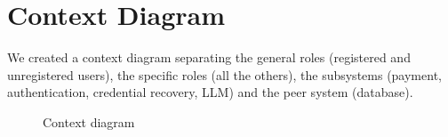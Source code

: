 \section{Context Diagram} \label{context-diagram}
We created a context diagram separating the general roles (registered and unregistered users), the specific roles (all the others), the subsystems (payment, authentication, credential recovery, LLM) and the peer system (database).

\begin{figure}[H]
	\centering
	\caption{Context diagram}
	\label{fig:context-diagram}
\end{figure}